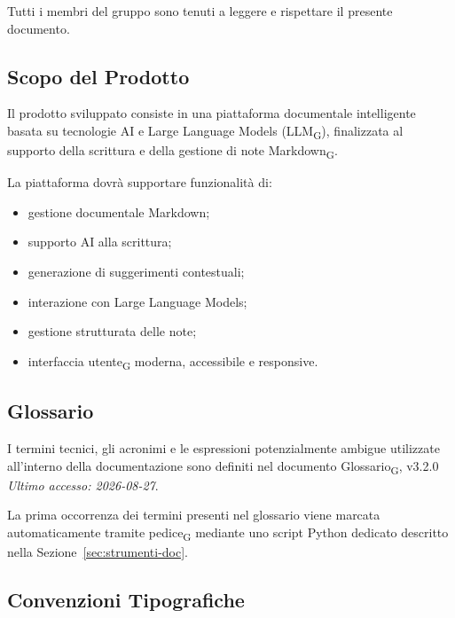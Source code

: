 Tutti i membri del gruppo sono tenuti a leggere e rispettare il presente documento.


\subsection{Scopo del Prodotto}

Il prodotto sviluppato consiste in una piattaforma documentale intelligente basata su tecnologie AI e Large Language Models (LLM\textsubscript{G}), finalizzata al supporto della scrittura e della gestione di note Markdown\textsubscript{G}.

La piattaforma dovrà supportare funzionalità di:
\begin{itemize}
    \item gestione documentale Markdown;
    \item supporto AI alla scrittura;
    \item generazione di suggerimenti contestuali;
    \item interazione con Large Language Models;
    \item gestione strutturata delle note;
    \item interfaccia utente\textsubscript{G} moderna, accessibile e responsive.
\end{itemize}


\subsection{Glossario}

I termini tecnici, gli acronimi e le espressioni potenzialmente ambigue utilizzate all'interno della documentazione sono definiti nel documento
{Glossario\textsubscript{G}, v3.2.0} \\
\textit{Ultimo accesso: 2026-08-27}.

La prima occorrenza dei termini presenti nel glossario viene marcata automaticamente tramite pedice\textsubscript{G} mediante uno script Python dedicato descritto nella Sezione~\ref{sec:strumenti-doc}.


\subsection{Convenzioni Tipografiche}

